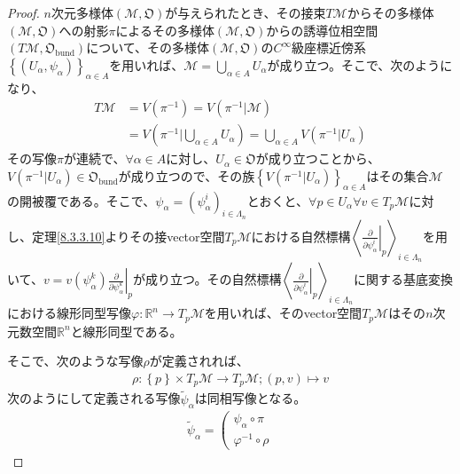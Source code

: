 \documentclass[dvipdfmx]{jsarticle}
\begin{document}
\begin{proof}
  $n$次元多様体$\left(\mathcal{M},\mathfrak{O}\right)$が与えられたとき、その接束$T\mathcal{M}$からその多様体$\left(\mathcal{M},\mathfrak{O}\right)$への射影$\pi $によるその多様体$\left(\mathcal{M},\mathfrak{O}\right)$からの誘導位相空間$\left(T\mathcal{M},\mathfrak{O}_\mathrm{bund}\right)$について、その多様体$\left(\mathcal{M},\mathfrak{O}\right)$の$C^\infty$級座標近傍系$\left\{ \left(U_\alpha ,\psi_\alpha \right)\right\}_{\alpha \in A}$を用いれば、$\mathcal{M}=\bigcup_{\alpha \in A} U_\alpha $が成り立つ。そこで、次のようになり、
  \begin{align*}
    T\mathcal{M} &=V\left(\pi^{-1}\right) =V\left(\pi^{-1}|\mathcal{M}\right) \\
    &=V\left(\pi^{-1}|\bigcup_{\alpha \in A} U_\alpha \right) =\bigcup_{\alpha \in A} V\left(\pi^{-1} |U_\alpha \right)
  \end{align*}
  その写像$\pi $が連続で、$\forall \alpha \in A$に対し、$U_\alpha \in \mathfrak{O}$が成り立つことから、$V\left(\pi^{-1} |U_\alpha \right) \in \mathfrak{O}_\mathrm{bund}$が成り立つので、その族$\left\{ V\left(\pi^{-1} |U_\alpha \right)\right\}_{\alpha \in A}$はその集合$\mathcal{M}$の開被覆である。そこで、$\psi_\alpha =\left(\psi_\alpha^i \right)_{i\in \varLambda_n }$とおくと、$\forall p\in U_\alpha \forall v\in T_p \mathcal{M}$に対し、定理\ref{8.3.3.10}よりその接vector空間$T_p \mathcal{M}$における自然標構$\left\langle \left. \frac{\partial}{\partial \psi_\alpha^i }\right|_p \right\rangle_{i\in \varLambda_n }$を用いて、$v=v\left(\psi_\alpha^k \right) \left. \frac{\partial}{\partial \psi_\alpha^k }\right|_p $が成り立つ。その自然標構$\left\langle \left. \frac{\partial}{\partial \psi_\alpha^i }\right|_p \right\rangle_{i\in \varLambda_n }$に関する基底変換における線形同型写像$\varphi : \mathbb{R}^n \rightarrow T_p \mathcal{M} $を用いれば、そのvector空間$T_p \mathcal{M}$はその$n$次元数空間$\mathbb{R}^n $と線形同型である。\par
  そこで、次のような写像$\rho $が定義されれば、
  \begin{align*}
    \rho : \left\{ p\right\} \times T_p \mathcal{M} \rightarrow T_p \mathcal{M} ;\left(p,v\right) \mapsto v
  \end{align*}
  次のようにして定義される写像$\widetilde{\psi }_\alpha $は同相写像となる。
  \begin{align*}
    \widetilde{\psi }_\alpha =\left( \begin{matrix}
      \psi_\alpha \circ \pi \\
      \varphi^{-1} \circ \rho 

\end{matrix}
\end{align*}
\end{proof}
\end{document}
